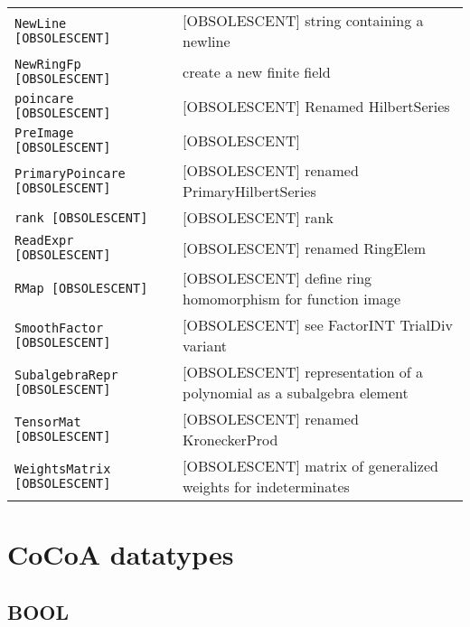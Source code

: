 \documentclass[a4paper]{mybook}
\begin{document}
\begin{center}
\begin{longtable}{ll}
{\verb~NewLine [OBSOLESCENT]~} &
      [OBSOLESCENT] string containing a newline\\
   
{\verb~NewRingFp [OBSOLESCENT]~} &
      create a new finite field\\
   
{\verb~poincare [OBSOLESCENT]~} &
      [OBSOLESCENT] Renamed HilbertSeries\\
   
{\verb~PreImage [OBSOLESCENT]~} &
      [OBSOLESCENT]\\
   
{\verb~PrimaryPoincare [OBSOLESCENT]~} &
      [OBSOLESCENT] renamed PrimaryHilbertSeries\\
   
{\verb~rank [OBSOLESCENT]~} &
      [OBSOLESCENT] rank\\
   
{\verb~ReadExpr [OBSOLESCENT]~} &
       [OBSOLESCENT] renamed RingElem\\
   
{\verb~RMap [OBSOLESCENT]~} &
      [OBSOLESCENT] define ring homomorphism for function image\\
   
{\verb~SmoothFactor [OBSOLESCENT]~} &
      [OBSOLESCENT] see FactorINT TrialDiv variant\\
   
{\verb~SubalgebraRepr [OBSOLESCENT]~} &
      [OBSOLESCENT] representation of a polynomial as a subalgebra element\\
   
{\verb~TensorMat [OBSOLESCENT]~} &
      [OBSOLESCENT] renamed KroneckerProd\\
   
{\verb~WeightsMatrix [OBSOLESCENT]~} &
      [OBSOLESCENT] matrix of generalized weights for indeterminates\\
   
\end{longtable}
\end{center}
\noindent


\part{CoCoA datatypes}
\setcounter{chapter}{0}
    

\chapter{BOOL}
\label{BOOL}
\end{document}
